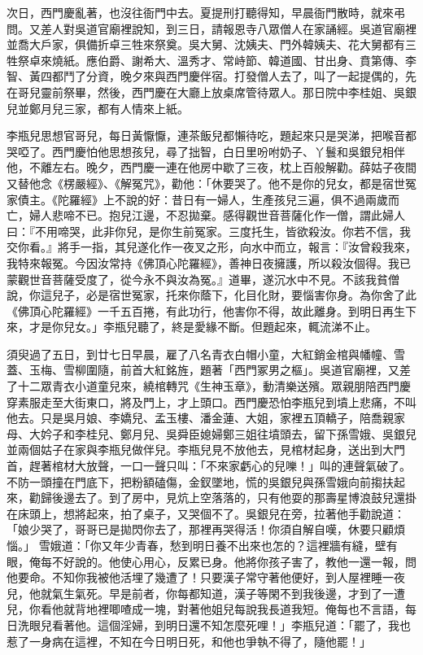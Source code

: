 次日，西門慶亂著，也沒往衙門中去。夏提刑打聽得知，早晨衙門散時，就來弔問。又差人對吳道官廟裡說知，到三日，請報恩寺八眾僧人在家誦經。吳道官廟裡並喬大戶家，俱備折卓三牲來祭奠。吳大舅、沈姨夫、門外韓姨夫、花大舅都有三牲祭卓來燒紙。應伯爵、謝希大、溫秀才、常峙節、韓道國、甘出身、賁第傳、李智、黃四都鬥了分資，晚夕來與西門慶伴宿。打發僧人去了，叫了一起提偶的，先在哥兒靈前祭畢，然後，西門慶在大廳上放桌席管待眾人。那日院中李桂姐、吳銀兒並鄭月兒三家，都有人情來上紙。

李瓶兒思想官哥兒，每日黃懨懨，連茶飯兒都懶待吃，題起來只是哭涕，把喉音都哭啞了。西門慶怕他思想孩兒，尋了拙智，白日里吩咐奶子、丫鬟和吳銀兒相伴他，不離左右。晚夕，西門慶一連在他房中歇了三夜，枕上百般解勸。薛姑子夜間又替他念《楞嚴經》、《解冤咒》，勸他：「休要哭了。他不是你的兒女，都是宿世冤家債主。《陀羅經》上不說的好：昔日有一婦人，生產孩兒三遍，俱不過兩歲而亡，婦人悲啼不已。抱兒江邊，不忍拋棄。感得觀世音菩薩化作一僧，謂此婦人曰：『不用啼哭，此非你兒，是你生前冤家。三度托生，皆欲殺汝。你若不信，我交你看。』將手一指，其兒遂化作一夜叉之形，向水中而立，報言：『汝曾殺我來，我特來報冤。今因汝常持《佛頂心陀羅經》，善神日夜擁護，所以殺汝個得。我已蒙觀世音菩薩受度了，從今永不與汝為冤。』道畢，遂沉水中不見。不該我貧僧說，你這兒子，必是宿世冤家，托來你蔭下，化目化財，要惱害你身。為你舍了此《佛頂心陀羅經》一千五百捲，有此功行，他害你不得，故此離身。到明日再生下來，才是你兒女。」李瓶兒聽了，終是愛緣不斷。但題起來，輒流涕不止。

須臾過了五日，到廿七日早晨，雇了八名青衣白帽小童，大紅銷金棺與幡幢、雪蓋、玉梅、雪柳圍隨，前首大紅銘旌，題著「西門冢男之樞」。吳道官廟裡，又差了十二眾青衣小道童兒來，繞棺轉咒《生神玉章》，動清樂送殯。眾親朋陪西門慶穿素服走至大街東口，將及門上，才上頭口。西門慶恐怕李瓶兒到墳上悲痛，不叫他去。只是吳月娘、李嬌兒、孟玉樓、潘金蓮、大姐，家裡五頂轎子，陪喬親家母、大妗子和李桂兒、鄭月兒、吳舜臣媳婦鄭三姐往墳頭去，留下孫雪娥、吳銀兒並兩個姑子在家與李瓶兒做伴兒。李瓶兒見不放他去，見棺材起身，送出到大門首，趕著棺材大放聲，一口一聲只叫：「不來家虧心的兒嚛！」叫的連聲氣破了。不防一頭撞在門底下，把粉額磕傷，金釵墜地，慌的吳銀兒與孫雪娥向前搊扶起來，勸歸後邊去了。到了房中，見炕上空落落的，只有他耍的那壽星博浪鼓兒還掛在床頭上，想將起來，拍了桌子，又哭個不了。吳銀兒在旁，拉著他手勸說道：「娘少哭了，哥哥已是拋閃你去了，那裡再哭得活！你須自解自嘆，休要只顧煩惱。」 雪娥道：「你又年少青春，愁到明日養不出來也怎的？這裡牆有縫，壁有眼，俺每不好說的。他使心用心，反累已身。他將你孩子害了，教他一還一報，問他要命。不知你我被他活埋了幾遭了！只要漢子常守著他便好，到人屋裡睡一夜兒，他就氣生氣死。早是前者，你每都知道，漢子等閑不到我後邊，才到了一遭兒，你看他就背地裡唧喳成一塊，對著他姐兒每說我長道我短。俺每也不言語，每日洗眼兒看著他。這個淫婦，到明日還不知怎麼死哩！」李瓶兒道：「罷了，我也惹了一身病在這裡，不知在今日明日死，和他也爭執不得了，隨他罷！」

